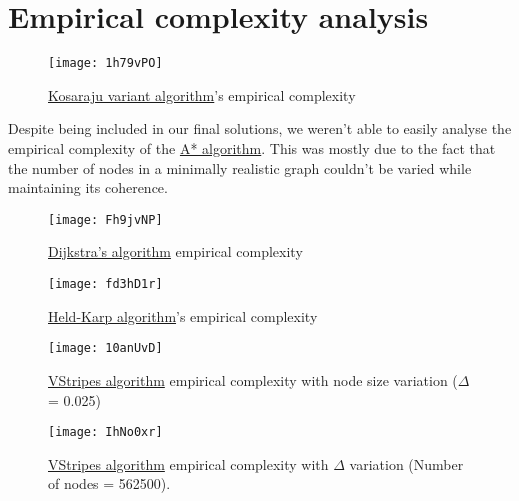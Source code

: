 \chapter{Empirical complexity analysis} \label{empirical}

\begin{figure}[H]
    \centering
    \texttt{[image: 1h79vPO]}
    \caption{\hyperref[algorithm-scc-kosaraju-v]{Kosaraju variant algorithm}'s empirical complexity}
\end{figure}

Despite being included in our final solutions, we weren't able to easily analyse the empirical complexity of the \hyperref[algorithm-shortestpath-astar]{A* algorithm}. This was mostly due to the fact that the number of nodes in a minimally realistic graph couldn't be varied while maintaining its coherence. 

\begin{figure}[H]
    \centering
    \texttt{[image: Fh9jvNP]}
    \caption{\hyperref[algorithm-shortestpath-dijkstra]{Dijkstra's algorithm} empirical complexity}
\end{figure}

\begin{figure}[H]
    \centering
    \texttt{[image: fd3hD1r]}
    \caption{\hyperref[algorithm-tsp-heldkarp]{Held-Karp algorithm}'s empirical complexity}
\end{figure}

\begin{figure}[H]
    \centering
    \texttt{[image: 10anUvD]}
    \caption{\hyperref[algorithm-vstripes]{VStripes algorithm} empirical complexity with node size variation ($\Delta$ = 0.025)}
\end{figure}

\begin{figure}[H]
    \centering
    \texttt{[image: IhNo0xr]}
    \caption{\hyperref[algorithm-vstripes]{VStripes algorithm} empirical complexity with $\Delta$ variation (Number of nodes = 562500).}
\end{figure}

